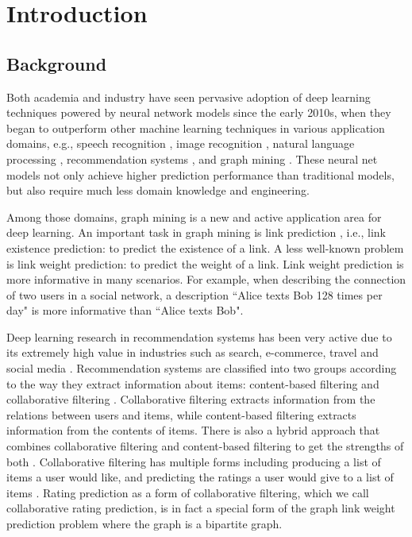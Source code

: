 \documentclass[12pt]{WSUThesis}
\theoremstyle{definition}
\begin{document}
%

\setUpThesisStyle
\setcounter{chapter}{0}
\chapter{Introduction}
\label{chapter:introduction}

\section{Background}
Both academia and industry have seen pervasive adoption of deep learning 
techniques powered by neural network models since the early 2010s,
when they began to outperform other machine learning techniques in various 
application domains, e.g.,
speech recognition \cite{hannun2014deep},
image recognition \cite{simonyan2014very},
natural language processing \cite{yao2013recurrent},
recommendation systems \cite{barkan2016item2vec},
and graph mining \cite{grover2016node2vec}.
These neural net models not only achieve higher prediction performance than 
traditional models,
but also require much less domain knowledge and engineering.

Among those domains,
graph mining is a new and active application area for deep learning.
An important task in graph mining is link prediction \cite{liben2007link} 
\cite{al2006link}, i.e., link existence prediction:
to predict the existence of a link.
A less well-known problem is link weight prediction: to predict the weight of a link.
Link weight prediction is more informative in many scenarios.
For example, when describing the connection of two users in a social network,
a description ``Alice texts Bob 128 times per day" is more informative than
``Alice texts Bob".

Deep learning research in recommendation systems has been very active  
due to its extremely high value in industries such as search, e-commerce, 
travel and social media \cite{buettner2016predicting}.
Recommendation systems are classified into two groups according to the way they 
extract information about items: content-based filtering and collaborative 
filtering \cite{ricci2011introduction}.
Collaborative filtering extracts information from the relations between users 
and items, while content-based filtering extracts information from the contents 
of items.
There is also a hybrid approach that combines collaborative filtering and 
content-based filtering to get the strengths of both 
\cite{adomavicius2005toward}.
Collaborative filtering has multiple forms including producing a list of items 
a user would like, and predicting the ratings a user would give to a list of 
items \cite{su2009survey}.
Rating prediction as a form of collaborative filtering,
which we call collaborative rating prediction,
is in fact a special form of the graph link weight prediction problem where the graph is a bipartite graph.
\end{document}
